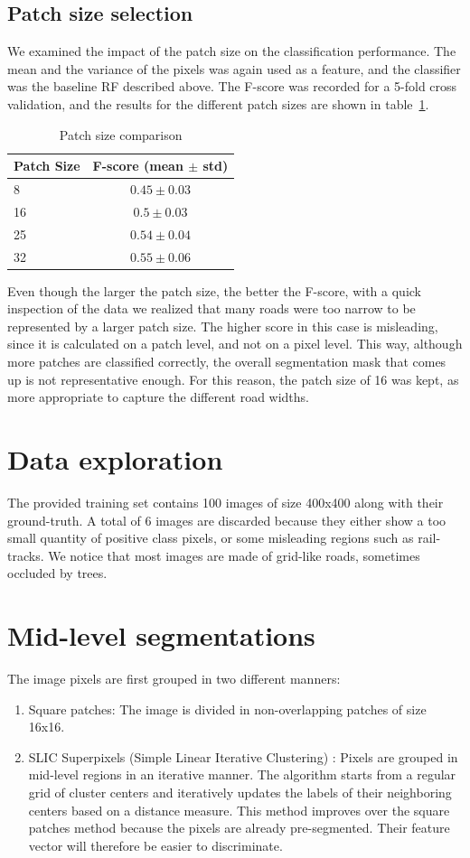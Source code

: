 \documentclass[10pt,conference,compsocconf]{IEEEtran}
\begin{document}
	\subsection{Patch size selection}
	We examined the impact of the patch size on the classification performance. The mean and the variance of the pixels was again used as a feature, and the classifier was the baseline RF described above. The F-score was recorded for a 5-fold cross validation, and the results for the different patch sizes are shown in table~\ref{patch_size}.
	\begin{table}[h]	
	\centering
	\begin{tabular}{lc}
		\hline \hline		
		\textbf{Patch Size} &  \textbf{F-score (mean $\pm$ std)} \\
		\hline
		8 & $0.45 \pm 0.03$ \\
		16 & $0.5 \pm 0.03$ \\
		25 & $0.54 \pm 0.04$ \\
		32 & $0.55 \pm 0.06$ \\
		\hline
	\end{tabular}
	\label{patch_size}
	\caption{Patch size comparison}
	\end{table}
	Even though the larger the patch size, the better the F-score, with a quick inspection of the data we realized that many roads were too narrow to be represented by a larger patch size. The higher score in this case is misleading, since it is calculated on a patch level, and not on a pixel level. This way, although more patches are classified correctly, the overall segmentation mask that comes up is not representative enough. For this reason, the patch size of 16 was kept, as more appropriate to capture the different road widths.
	\section{Data exploration}
	\label{sec:orgheadline7}
	The provided training set contains 100 images of size 400x400 along with their ground-truth. A total of 6 images are discarded because they either show a too small quantity of positive class pixels, or some misleading regions such as rail-tracks. 
	We notice that most images are made of grid-like roads, sometimes occluded by trees. 
	\section{Mid-level segmentations}
	\label{sec:orgheadline8}
	The image pixels are first grouped in two different manners:
	\begin{enumerate}
		\item Square patches: The image is divided in non-overlapping patches of size 16x16.
		\item SLIC Superpixels (Simple Linear Iterative Clustering) \cite{achanta12}: Pixels are grouped in mid-level regions in an iterative manner. The algorithm starts from a regular grid of cluster centers and iteratively updates the labels of their neighboring centers based on a distance measure. This method improves over the square patches method because the pixels are already pre-segmented. Their feature vector will therefore be easier to discriminate.
	\end{enumerate}
\end{document}
